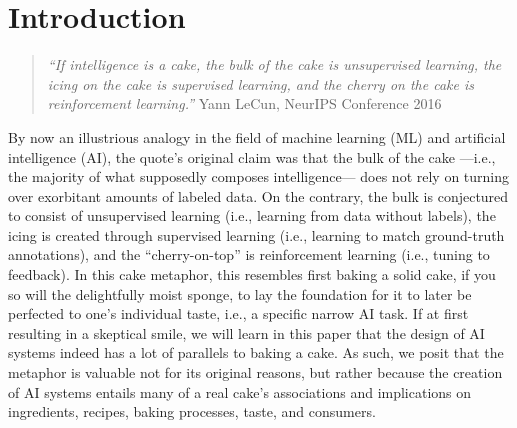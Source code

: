 \documentclass[manuscript,screen,authorversion,nonacm]{acmart}
\begin{document}
\maketitle

\section{Introduction}
\label{intro}

\begin{quote}
	\emph{``If intelligence is a cake, the bulk of the cake is unsupervised learning, the icing on the cake is supervised learning, and the cherry on the cake is reinforcement learning.''} Yann LeCun, NeurIPS Conference 2016
\end{quote} 

\noindent By now an illustrious analogy in the field of machine learning (ML) and artificial intelligence (AI), the quote's original claim was that the bulk of the cake ---i.e., the majority of what supposedly composes intelligence--- does not rely on turning over exorbitant amounts of labeled data. On the contrary, the bulk is conjectured to consist of unsupervised learning (i.e., learning from data without labels), the icing is created through supervised learning (i.e., learning to match ground-truth annotations), and the ``cherry-on-top'' is reinforcement learning (i.e., tuning to feedback). 
In this cake metaphor, this resembles first baking a solid cake, if you so will the delightfully moist sponge, to lay the foundation for it to later be perfected to one's individual taste, i.e., a specific narrow AI task. If at first resulting in a skeptical smile, we will learn in this paper that the design of AI systems indeed has a lot of parallels to baking a cake. As such, we posit that the metaphor is valuable not for its original reasons, but rather because the creation of AI systems entails many of a real cake's associations and implications on ingredients, recipes, baking processes, taste, and consumers.   
\end{document}
